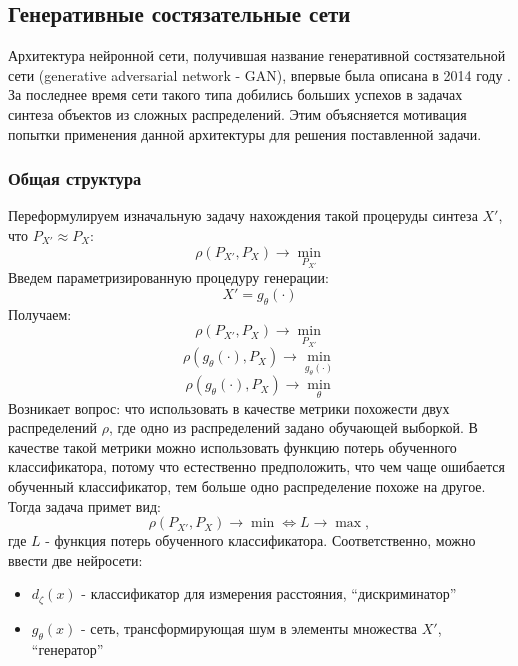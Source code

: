 	\subsection{Генеративные состязательные сети}
		Архитектура нейронной сети, получившая название генеративной состязательной сети (generative adversarial network - GAN), впервые была описана в 2014 году \cite{GAN-original}. За последнее время сети такого типа добились больших успехов в задачах синтеза объектов из сложных распределений. Этим объясняется мотивация попытки применения данной архитектуры для решения поставленной задачи.
		\subsubsection{Общая структура}
			Переформулируем изначальную задачу нахождения такой процеруды синтеза $X'$, что $ P_{X'} \approx P_X$:
			$$ \rho(P_{X'}, P_X) \longrightarrow \underset{P_{X'}}{\min} $$
			Введем параметризированную процедуру генерации:
			$$ X' = g_{\theta}(\cdot) $$
			Получаем:
			$$ \rho(P_{X'}, P_X) \longrightarrow \underset{P_{X'}}{\min} $$
			$$ \rho(g_{\theta}(\cdot), P_X) \longrightarrow \underset{g_{\theta}(\cdot)}{\min} $$
			$$ \rho(g_{\theta}(\cdot), P_X) \longrightarrow \underset{\theta}{\min} $$
			Возникает вопрос: что использовать в качестве метрики похожести двух распределений $\rho$, где одно из распределений задано обучающей выборкой.
			В качестве такой метрики можно использовать функцию потерь обученного классификатора, потому что естественно предположить, что чем чаще ошибается обученный классификатор, тем больше одно распределение похоже на другое. Тогда задача примет вид:
			$$ \rho(P_{X'}, P_X) \longrightarrow \min \Leftrightarrow L \longrightarrow \max, $$
			где $L$ - функция потерь обученного классификатора.
			Соответственно, можно ввести две нейросети:
	
			\begin{itemize}
				\item $d_{\zeta}(x)$ - классификатор для измерения расстояния, ``дискриминатор''
				\item $g_{\theta}(x)$ - сеть, трансформирующая шум в элементы множества $X'$, ``генератор''
			\end{itemize}
	
